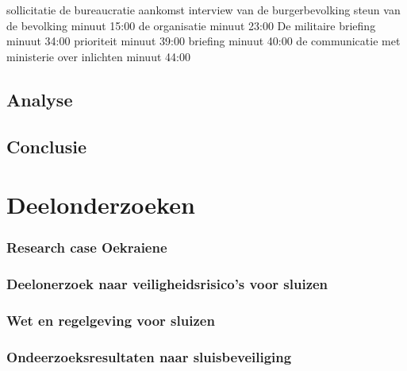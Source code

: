{{\cite{ovvMortierOngevalMaliVideo} 


\cite{bnnvara13062018malirapport}
\cite{eucal11012021malimissieverlengd}
\cite{nos21052014zorgenmalimissie}
\cite{meijnders}
\cite{bnrwebredactie}
\cite{keultjes01062016malimissiecoalitie}
\cite{veenhof18012019}

\cite{isitman06012016militair}
\cite{nporadio11072016filmdemissie}
\cite{parlementairmonitor15122013mortierongeluk}

sollicitatie
de bureaucratie
aankomst
interview van de burgerbevolking
steun van de bevolking minuut 15:00
de organisatie minuut 23:00
De militaire briefing minuut 34:00
prioriteit minuut 39:00
briefing minuut 40:00
de communicatie met ministerie over inlichten minuut 44:00

\cite{DemissieFilm}





\subsection{Analyse}


\subsection{Conclusie}


\newpage
\section{Deelonderzoeken}



\subsubsection{Research case Oekraiene}
\subsubsection{Deelonerzoek naar veiligheidsrisico's voor sluizen}
\subsubsection{Wet en regelgeving voor sluizen}


\subsubsection{Ondeerzoeksresultaten naar sluisbeveiliging}



}}
